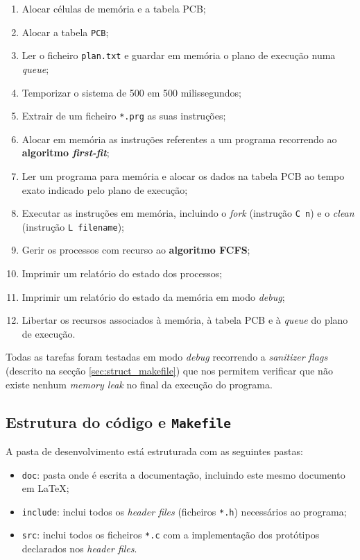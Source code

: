 \documentclass[a4paper,11pt,onecolumn,oneside]{article}
\begin{document}
	\begin{enumerate}
		\item Alocar células de memória e a tabela PCB;
		\item Alocar a tabela \texttt{\ac{PCB}};
		\item Ler o ficheiro \texttt{plan.txt} e guardar em memória o plano de execução numa \textit{queue};
		\item Temporizar o sistema de 500 em 500 milissegundos;
		\item Extrair de um ficheiro \texttt{*.prg} as suas instruções;
		\item Alocar em memória as instruções referentes a um programa recorrendo ao \textbf{algoritmo \textit{first-fit}};
		\item Ler um programa para memória e alocar os dados na tabela PCB ao tempo exato indicado pelo plano de execução;
		\item Executar as instruções em memória, incluindo o \textit{fork} (instrução \verb|C n|) e o \textit{clean} (instrução \verb|L filename|);
		\item Gerir os processos com recurso ao \textbf{algoritmo FCFS};
		\item Imprimir um relatório do estado dos processos;
		\item Imprimir um relatório do estado da memória em modo \textit{debug};
		\item Libertar os recursos associados à memória, à tabela PCB e à \textit{queue} do plano de execução.
	\end{enumerate}
	
	Todas as tarefas foram testadas em modo \textit{debug} recorrendo a \textit{sanitizer flags} (descrito na secção \ref{sec:struct_makefile}) que nos permitem verificar que não existe nenhum \textit{memory leak} no final da execução do programa.
	
	
	\subsection{Estrutura do código e \texttt{Makefile}}
	\label{ssec:dev:struct_makefile}
	
	A pasta de desenvolvimento está estruturada com as seguintes pastas:
	
	\begin{itemize}
		\item \verb|doc|: pasta onde é escrita a documentação, incluindo este mesmo documento em \LaTeX;
		\item \verb|include|: inclui todos os \textit{header files} (ficheiros \verb|*.h|) necessários ao programa;
		\item \verb|src|: inclui todos os ficheiros \verb|*.c| com a implementação dos protótipos declarados nos \textit{header files}.
	\end{itemize}
	
\end{document}
